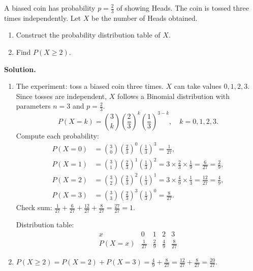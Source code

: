 \documentclass[11pt]{article}
\begin{document}
\begin{exoresolu}
A biased coin has probability $p=\frac{2}{3}$ of showing Heads. The coin is tossed three times independently. Let $X$ be the number of Heads obtained.
\begin{enumerate}
\item Construct the probability distribution table of $X$.
\item Find $P(X\ge 2)$.
\end{enumerate}
\tcblower
\textbf{Solution.}
\begin{enumerate}
\item The experiment: toss a biased coin three times. $X$ can take values $0,1,2,3$. Since tosses are independent, $X$ follows a Binomial distribution with parameters $n=3$ and $p=\frac{2}{3}$.
\[
P(X=k)=\binom{3}{k}\left(\frac{2}{3}\right)^k\left(\frac{1}{3}\right)^{3-k},\quad k=0,1,2,3.
\]
Compute each probability:
\begin{align*}
P(X=0)&=\binom{3}{0}\left(\frac{2}{3}\right)^0\left(\frac{1}{3}\right)^3=\frac{1}{27},\\
P(X=1)&=\binom{3}{1}\left(\frac{2}{3}\right)^1\left(\frac{1}{3}\right)^2=3\times\frac{2}{3}\times\frac{1}{9}=\frac{6}{27}=\frac{2}{9},\\
P(X=2)&=\binom{3}{2}\left(\frac{2}{3}\right)^2\left(\frac{1}{3}\right)^1=3\times\frac{4}{9}\times\frac{1}{3}=\frac{12}{27}=\frac{4}{9},\\
P(X=3)&=\binom{3}{3}\left(\frac{2}{3}\right)^3\left(\frac{1}{3}\right)^0=\frac{8}{27}.
\end{align*}
Check sum: $\frac{1}{27}+\frac{6}{27}+\frac{12}{27}+\frac{8}{27}=\frac{27}{27}=1$.

Distribution table:
\[
\begin{array}{c|cccc}
x & 0 & 1 & 2 & 3 \\ \hline
P(X=x) & \frac{1}{27} & \frac{2}{9} & \frac{4}{9} & \frac{8}{27}
\end{array}
\]

\item $P(X\ge 2)=P(X=2)+P(X=3)=\frac{4}{9}+\frac{8}{27}=\frac{12}{27}+\frac{8}{27}=\frac{20}{27}$.
\end{enumerate}
\end{exoresolu}
\end{document}
